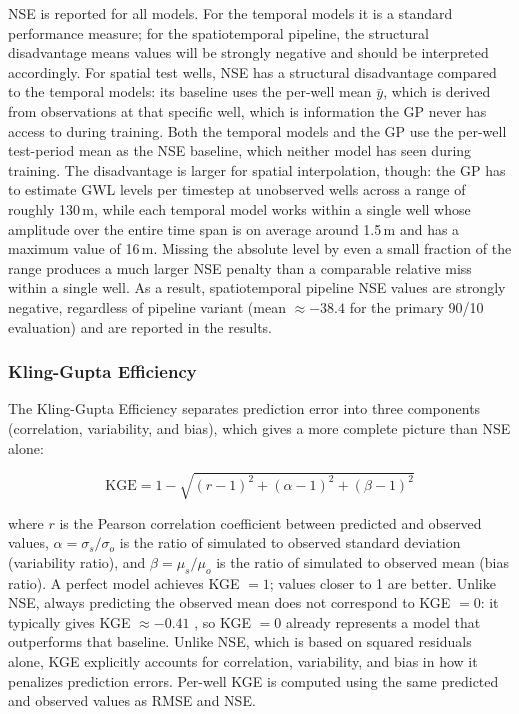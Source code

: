 NSE is reported for all models. For the temporal models it is a standard performance measure; for the spatiotemporal pipeline, the structural disadvantage means values will be strongly negative and should be interpreted accordingly. For spatial test wells, NSE has a structural disadvantage compared to the temporal models: its baseline uses the per-well mean $\bar{y}$, which is
derived from observations at that specific well, which is information the GP never has access to
during training. Both the temporal models and the GP use the per-well test-period mean as the NSE baseline, which neither model has seen during training. The disadvantage is larger for spatial interpolation, though: the GP has to estimate GWL levels per timestep at unobserved wells across a range of roughly 130\,m, while each temporal model works within a single well whose amplitude over the entire time span is on average around 1.5\,m and has a maximum value of 16\,m. Missing the absolute level by even a small fraction of the range produces a much larger NSE penalty than a comparable relative miss within a single well.
As a result, spatiotemporal pipeline NSE values are strongly negative, regardless of pipeline variant (mean $\approx -38.4$ for the primary 90/10 evaluation) and are reported in the results.

\subsubsection{Kling-Gupta Efficiency}
\label{subsec:kge}

The Kling-Gupta Efficiency \citep{gupta2009decomposition} separates prediction error into
three components (correlation, variability, and bias), which gives a more complete picture
than NSE alone:

\begin{equation}
  \text{KGE} = 1 - \sqrt{(r-1)^2 + (\alpha-1)^2 + (\beta-1)^2}
  \label{eq:kge}
\end{equation}

where $r$ is the Pearson correlation coefficient between predicted and observed values,
$\alpha = \sigma_s / \sigma_o$ is the ratio of simulated to observed standard deviation
(variability ratio), and $\beta = \mu_s / \mu_o$ is the ratio of simulated to observed mean
(bias ratio). A perfect model achieves KGE $= 1$; values closer to 1 are better. Unlike NSE, always predicting the observed mean does not correspond to KGE $= 0$:
it typically gives KGE $\approx -0.41$ \citep{knoben2019intercomparison}, so KGE $= 0$ already represents a model that
outperforms that baseline. Unlike NSE, which is based on squared residuals alone, KGE explicitly accounts for correlation, variability, and bias in how it penalizes prediction errors.
Per-well KGE is computed using the same predicted and observed values as RMSE and NSE.

